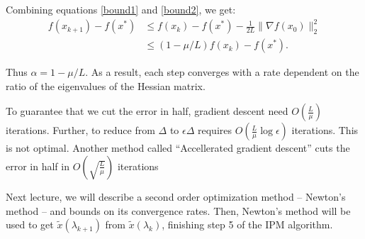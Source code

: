 \documentclass[11pt]{article}
\begin{document}
Combining equations \ref{bound1} and \ref{bound2}, we get:
\begin{align}
f(x_{k+1}) - f(x^*) &\leq f(x_k) - f(x^*) - \frac{1}{2L}\|\nabla f(x_0)\|^2_2 \\
& \leq (1 - \mu/L) f(x_k) - f(x^*). 
\end{align}

Thus $\alpha  = 1 - \mu / L$. As a result, each step converges with a rate dependent on the ratio of the eigenvalues of the Hessian matrix.

To guarantee that we cut the error in half, gradient descent need $O(\frac{L}{\mu})$ iterations. Further, to reduce from $\Delta$ to $\epsilon \Delta$ requires $O(\frac{L}{\mu}\log{\epsilon})$ iterations. This is not optimal. Another method called ``Accellerated gradient descent'' cuts the error in half in $O(\sqrt{\frac{L}{\mu}})$ iterations \cite{Nesterov83}

Next lecture, we will describe a second order optimization method -- Newton's method -- and bounds on its convergence rates. Then, Newton's method will be used to get $\tilde{x}(\lambda_{k+1})$ from $\tilde{x}(\lambda_k)$, finishing step 5 of the IPM algorithm.



\end{document}
